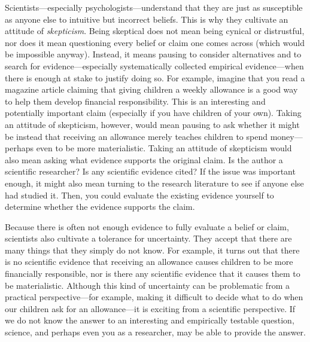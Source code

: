 
Scientists---especially psychologists---understand that they are just as susceptible as anyone else to intuitive but incorrect beliefs. This is why they cultivate an attitude of \emph{skepticism}. Being skeptical does not mean being cynical or distrustful, nor does it mean questioning every belief or claim one comes across (which would be impossible anyway). Instead, it means pausing to consider alternatives and to search for evidence---especially systematically collected empirical evidence---when there is enough at stake to justify doing so. For example, imagine that you read a magazine article claiming that giving children a weekly allowance is a good way to help them develop financial responsibility. This is an interesting and potentially important claim (especially if you have children of your own). Taking an attitude of skepticism, however, would mean pausing to ask whether it might be instead that receiving an allowance merely teaches children to spend money---perhaps even to be more materialistic. Taking an attitude of skepticism would also mean asking what evidence supports the original claim. Is the author a scientific researcher? Is any scientific evidence cited? If the issue was important enough, it might also mean turning to the research literature to see if anyone else had studied it. Then, you could evaluate the existing evidence yourself to determine whether the evidence supports the claim.

Because there is often not enough evidence to fully evaluate a belief or claim, scientists also cultivate a tolerance for uncertainty. They accept that there are many things that they simply do not know. For example, it turns out that there is no scientific evidence that receiving an allowance causes children to be more financially responsible, nor is there any scientific evidence that it causes them to be materialistic. Although this kind of uncertainty can be problematic from a practical perspective---for example, making it difficult to decide what to do when our children ask for an allowance---it is exciting from a scientific perspective. If we do not know the answer to an interesting and empirically testable question, science, and perhaps even you as a researcher, may be able to provide the answer.

